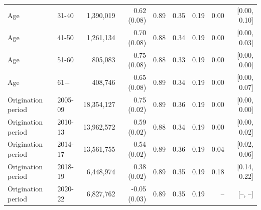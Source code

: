 \begin{tabular}{llrrrrrrr}
Age & 31-40 & 1,390,019 & 0.62 (0.08) & 0.89 & 0.35 & 0.19 & 0.00 & [0.00, 0.10] \\
Age & 41-50 & 1,261,134 & 0.70 (0.08) & 0.88 & 0.34 & 0.19 & 0.00 & [0.00, 0.03] \\
Age & 51-60 & 805,083 & 0.75 (0.08) & 0.88 & 0.33 & 0.19 & 0.00 & [0.00, 0.00] \\
Age & 61+ & 408,746 & 0.65 (0.08) & 0.89 & 0.34 & 0.19 & 0.00 & [0.00, 0.07] \\
\midrule
Origination period & 2005-09 & 18,354,127 & 0.75 (0.02) & 0.89 & 0.36 & 0.19 & 0.00 & [0.00, 0.00] \\
Origination period & 2010-13 & 13,962,572 & 0.59 (0.02) & 0.88 & 0.34 & 0.19 & 0.00 & [0.00, 0.02] \\
Origination period & 2014-17 & 13,561,755 & 0.54 (0.02) & 0.89 & 0.36 & 0.19 & 0.04 & [0.02, 0.06] \\
Origination period & 2018-19 & 6,448,974 & 0.38 (0.02) & 0.89 & 0.35 & 0.19 & 0.18 & [0.14, 0.22] \\
Origination period & 2020-22 & 6,827,762 & -0.05 (0.03) & 0.89 & 0.35 & 0.19 & -- & [--, --] \\
\bottomrule
\end{tabular}
